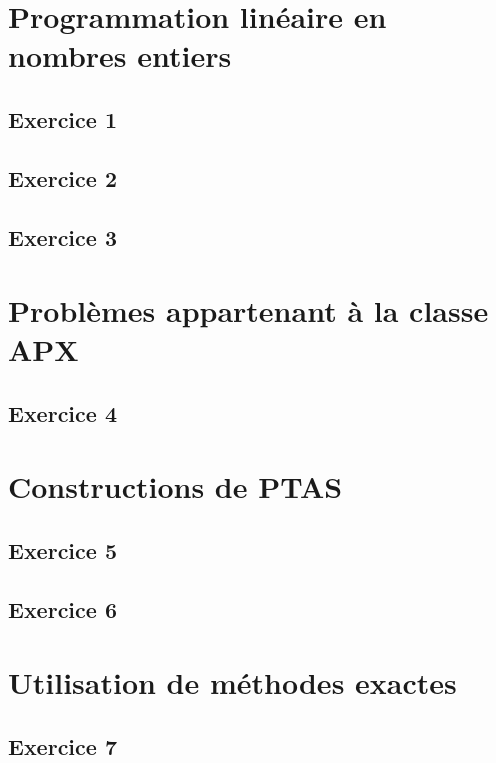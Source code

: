 \section{Programmation linéaire en nombres entiers}

\subsection{Exercice 1}


\subsection{Exercice 2}


\subsection{Exercice 3}


\section{Problèmes appartenant à la classe APX}

\subsection{Exercice 4}


\section{Constructions de PTAS}

\subsection{Exercice 5}


\subsection{Exercice 6}


\section{Utilisation de méthodes exactes}

\subsection{Exercice 7}


